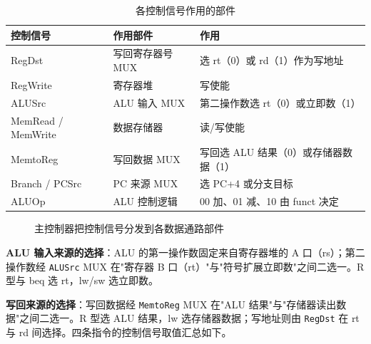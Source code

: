 \begin{table}[H]
\centering
\caption{各控制信号作用的部件}
\label{tab:signal_location}
\begin{tabulary}{\textwidth}{LLL}
\toprule
\textbf{控制信号} & \textbf{作用部件} & \textbf{作用} \\
\midrule
RegDst & 写回寄存器号 MUX & 选 rt（0）或 rd（1）作为写地址 \\
RegWrite & 寄存器堆 & 写使能 \\
ALUSrc & ALU 输入 MUX & 第二操作数选 rt（0）或立即数（1） \\
MemRead / MemWrite & 数据存储器 & 读/写使能 \\
MemtoReg & 写回数据 MUX & 写回选 ALU 结果（0）或存储器数据（1） \\
Branch / PCSrc & PC 来源 MUX & 选 PC+4 或分支目标 \\
ALUOp & ALU 控制逻辑 & 00 加、01 减、10 由 funct 决定 \\
\bottomrule
\end{tabulary}
\end{table}

\begin{figure}[H]
\centering
{}
\caption{主控制器把控制信号分发到各数据通路部件}
\label{fig:control_signals}
\end{figure}

\textbf{ALU 输入来源的选择}：ALU 的第一操作数固定来自寄存器堆的 A 口（rs）；第二操作数经 \texttt{ALUSrc} MUX 在"寄存器 B 口（rt）"与"符号扩展立即数"之间二选一。R 型与 beq 选 rt，lw/sw 选立即数。

\textbf{写回来源的选择}：写回数据经 \texttt{MemtoReg} MUX 在"ALU 结果"与"存储器读出数据"之间二选一。R 型选 ALU 结果，lw 选存储器数据；写地址则由 \texttt{RegDst} 在 rt 与 rd 间选择。四条指令的控制信号取值汇总如下。

